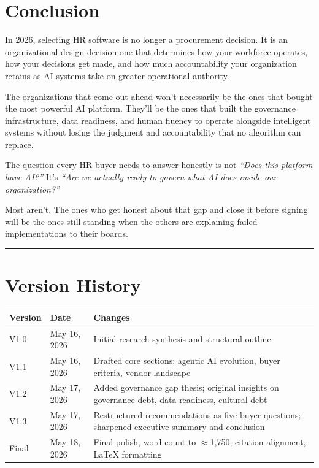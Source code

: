 \documentclass[12pt, a4paper]{article}
\begin{document}
\section*{Conclusion}

In 2026, selecting HR software is no longer a procurement decision. It is an
organizational design decision one that determines how your workforce operates, how
your decisions get made, and how much accountability your organization retains as AI
systems take on greater operational authority.

The organizations that come out ahead won't necessarily be the ones that bought the most
powerful AI platform. They'll be the ones that built the governance infrastructure, data
readiness, and human fluency to operate alongside intelligent systems without losing the
judgment and accountability that no algorithm can replace.

The question every HR buyer needs to answer honestly is not \emph{``Does this platform
have AI?''} It's \emph{``Are we actually ready to govern what AI does inside our
organization?''}

Most aren't. The ones who get honest about that gap and close it before signing will
be the ones still standing when the others are explaining failed implementations to their
boards.
\newpage
\noindent\rule{\linewidth}{0.4pt}

\section*{Version History}

\begin{center}
\begin{tabularx}{\linewidth}{p{1.4cm} p{3cm} X}
\toprule
\textbf{Version} & \textbf{Date} & \textbf{Changes} \\
\midrule
V1.0 & May 16, 2026 & Initial research synthesis and structural outline \\
V1.1 & May 16, 2026 & Drafted core sections: agentic AI evolution, buyer criteria, vendor landscape \\
V1.2 & May 17, 2026 & Added governance gap thesis; original insights on governance debt, data readiness, cultural debt \\
V1.3 & May 17, 2026 & Restructured recommendations as five buyer questions; sharpened executive summary and conclusion \\
Final & May 18, 2026 & Final polish, word count to $\approx$1{,}750, citation alignment, LaTeX formatting \\
\bottomrule
\end{tabularx}
\end{center}
\end{document}
